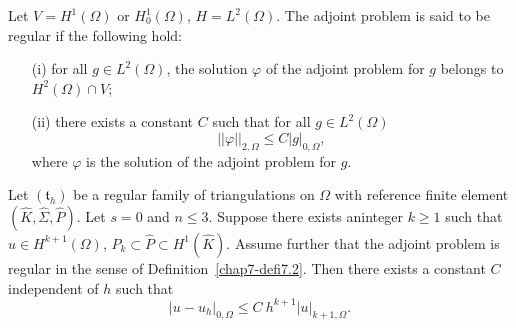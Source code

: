 \begin{definition}\label{chap7-defi7.2}
Let $V=H^{1}(\Omega)$ or $H^{1}_{0}(\Omega)$, $H=L^{2}(\Omega)$. The
adjoint problem is said to be regular if the following hold:
\begin{itemize}
\item[(i)] for all $g\in L^{2}(\Omega)$, the solution $\varphi$ of the
  adjoint problem for $g$ belongs to $H^{2}(\Omega)\cap V$;

\item[(ii)] there exists a constant $C$ such that for all $g\in
  L^{2}(\Omega)$ 
\begin{equation*}
||\varphi||_{2,\Omega}\leq
C|g|_{0,\Omega},\tag{7.17}\label{chap7-eq7.17} 
\end{equation*}
where $\varphi$ is the solution of the adjoint problem for $g$.
\end{itemize}
\end{definition}

\begin{theorem}\label{chap7-thm7.4}
Let $(\mathfrak{t}_{h})$ be a regular family of triangulations on
$\Omega$ with reference finite element
$(\hat{K},\hat{\Sigma},\hat{P})$. Let $s=0$ and $n\leq 3$. Suppose
there exists an\pageoriginale integer $k\geq 1$ such that $u\in
H^{k+1}(\Omega)$, $P_{k}\subset \hat{P}\subset H^{1}(\hat{K})$. Assume
further that the adjoint problem is regular in the sense of
Definition~\ref{chap7-defi7.2}. Then there exists a constant $C$
independent of $h$ such that
\begin{equation*}
|u-u_{h}|_{0,\Omega}\leq
C\ h^{k+1}|u|_{k+1,\Omega}.\tag{7.18}\label{chap7-eq7.18} 
\end{equation*}
\end{theorem}

